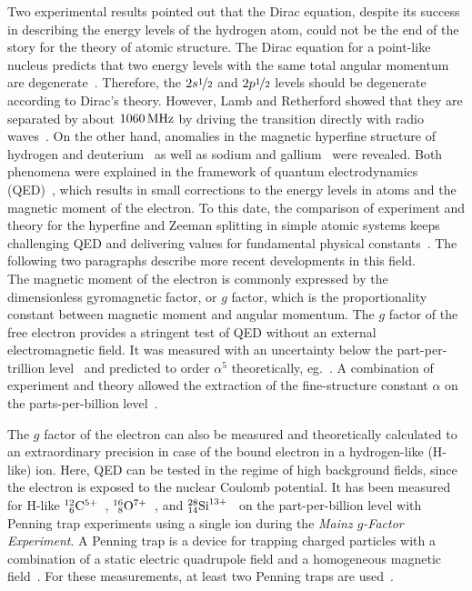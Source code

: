 Two experimental results pointed out that the Dirac equation, despite its success in describing the energy levels of the hydrogen atom, could not be the end of the story for the theory of atomic structure. 
The Dirac equation for a point-like nucleus predicts that two energy levels with the same total angular momentum are degenerate~\cite{greiner2000}. Therefore, the $2s\nicefrac{1}{2}$ and $2p\nicefrac{1}{2}$ levels should be degenerate according to Dirac's theory. However, Lamb and Retherford showed that they are separated by about $1060\,\rm{MHz}$ by driving the transition directly with radio waves~\cite{lamb1947}. On the other hand, anomalies in the magnetic hyperfine structure of hydrogen and deuterium~\cite{nafe1947} as well as sodium and gallium~\cite{kusch1947,kusch1948} were revealed. Both phenomena were explained in the framework of quantum electrodynamics (QED)~\cite{schwinger1948}, which results in small corrections to the energy levels in atoms and the magnetic moment of the electron. To this date, the comparison of experiment and theory for the hyperfine and Zeeman splitting in simple atomic systems keeps challenging QED and delivering values for fundamental physical constants~\cite{haensch1979}. The following two paragraphs describe more recent developments in this field.\\[11pt]
The magnetic moment of the electron is commonly expressed by the dimensionless gyromagnetic factor, or $g$ factor, which is the proportionality constant between magnetic moment and angular momentum. The $g$ factor of the free electron provides a stringent test of QED without an external electromagnetic field. It was measured with an uncertainty below the part-per-trillion level~\cite{odom2006,hanneke2008} and predicted to order $\alpha^5$ theoretically, eg.~\cite{kinoshita2006,aoyama2007,aoyama2015,aoyama2017}. A combination of experiment and theory allowed the extraction of the fine-structure constant $\alpha$ on the parts-per-billion level~\cite{gabrielse2006,gabrielse2007}.

The $g$ factor of the electron can also be measured and theoretically calculated to an extraordinary precision in case of the bound electron in a hydrogen-like (H-like) ion. Here, QED can be tested in the regime of high background fields, since the electron is exposed to the nuclear Coulomb potential. It has been measured for H-like $^{12}_{\phantom{0}6}\rm{C}^{5+}$~\cite{Haffner2000,Sturm2014}, $^{16}_{\phantom{0}8}\rm{O}^{7+}$~\cite{Verdu2004}, and $^{28}_{14}\rm{Si}^{13+}$~\cite{Sturm2011} on the part-per-billion level with Penning trap experiments using a single ion during the \textit{Mainz $g$-Factor Experiment}. A Penning trap is a device for trapping charged particles with a combination of a static electric quadrupole field and a homogeneous magnetic field~\cite{geoniumtheory}. For these measurements, at least two Penning traps are used~\cite{annphysgfactor}.

